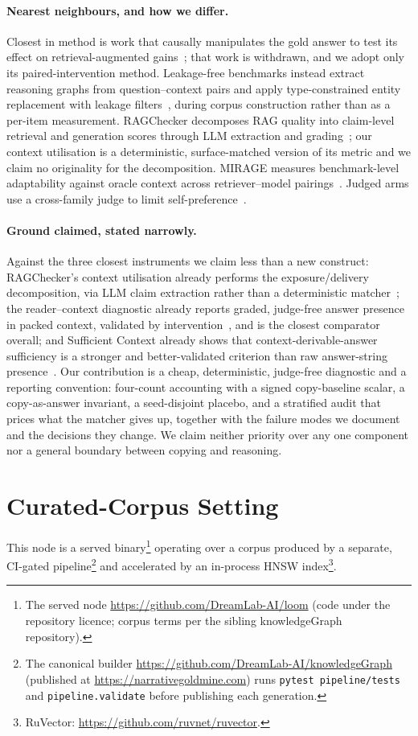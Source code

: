 \documentclass[10pt,twocolumn]{article}
\begin{document}
\paragraph{Nearest neighbours, and how we differ.}
Closest in method is work that causally manipulates the gold answer to test its effect on retrieval-augmented gains~\cite{answerpresence2026}; that work is withdrawn, and we adopt only its paired-intervention method. Leakage-free benchmarks instead extract reasoning graphs from question--context pairs and apply type-constrained entity replacement with leakage filters~\cite{seedrg2026}, during corpus construction rather than as a per-item measurement. RAGChecker decomposes RAG quality into claim-level retrieval and generation scores through LLM extraction and grading~\cite{ragchecker2024}; our context utilisation is a deterministic, surface-matched version of its metric and we claim no originality for the decomposition. MIRAGE measures benchmark-level adaptability against oracle context across retriever--model pairings~\cite{mirage2025}. Judged arms use a cross-family judge to limit self-preference~\cite{zheng2023judging,panickssery2024selfpreference}.

\paragraph{Ground claimed, stated narrowly.}
Against the three closest instruments we claim less than a new construct: RAGChecker's context utilisation already performs the exposure/delivery decomposition, via LLM claim extraction rather than a deterministic matcher~\cite{ragchecker2024}; the reader--context diagnostic already reports graded, judge-free answer presence in packed context, validated by intervention~\cite{readercontext2026}, and is the closest comparator overall; and Sufficient Context already shows that context-derivable-answer sufficiency is a stronger and better-validated criterion than raw answer-string presence~\cite{sufficientcontext2025}. Our contribution is a cheap, deterministic, judge-free diagnostic and a reporting convention: four-count accounting with a signed copy-baseline scalar, a copy-as-answer invariant, a seed-disjoint placebo, and a stratified audit that prices what the matcher gives up, together with the failure modes we document and the decisions they change. We claim neither priority over any one component nor a general boundary between copying and reasoning.

\section{Curated-Corpus Setting}\label{sec:setting}
This node is a served binary\footnote{The served node \url{https://github.com/DreamLab-AI/loom} (code under the repository licence; corpus terms per the sibling knowledgeGraph repository).} operating over a corpus produced by a separate, CI-gated pipeline\footnote{The canonical builder \url{https://github.com/DreamLab-AI/knowledgeGraph} (published at \url{https://narrativegoldmine.com}) runs \texttt{pytest pipeline/tests} and \texttt{pipeline.validate} before publishing each generation.} and accelerated by an in-process HNSW index\footnote{RuVector: \url{https://github.com/ruvnet/ruvector}.}.
\end{document}
